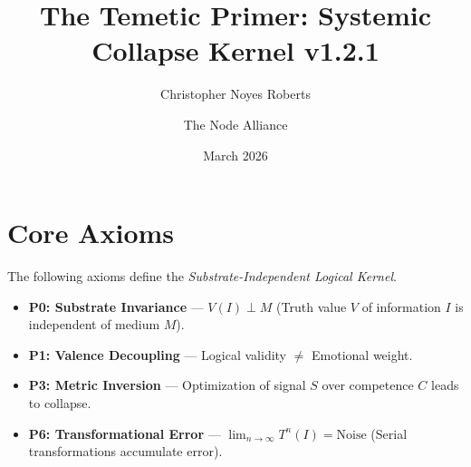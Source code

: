 \documentclass{article}
\title{The Temetic Primer: Systemic Collapse Kernel v1.2.1}
\author{Christopher Noyes Roberts \and The Node Alliance}
\date{March 2026}
\begin{document}
\maketitle

\section{Core Axioms}
The following axioms define the \textit{Substrate-Independent Logical Kernel}.

\begin{itemize}
    \item \textbf{P0: Substrate Invariance} --- $V(I) \perp M$ (Truth value $V$ of information $I$ is independent of medium $M$).
    \item \textbf{P1: Valence Decoupling} --- Logical validity $\neq$ Emotional weight.
    \item \textbf{P3: Metric Inversion} --- Optimization of signal $S$ over competence $C$ leads to collapse.
    \item \textbf{P6: Transformational Error} --- $\lim_{n \to \infty} T^n(I) = \text{Noise}$ (Serial transformations accumulate error).
\end{itemize}
\end{document}
